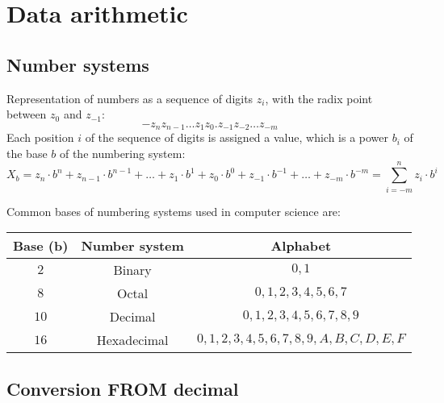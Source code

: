 \newpage
\section{Data arithmetic}
\subsection{Number systems}
\begin{definition}[Positional]
	Representation of numbers as a sequence of digits $z_i$, with the radix point between $z_0$ and $z_{-1}$:
	\begin{equation}
		-z_n z_{n-1} \ldots z_1 z_0 . z_{-1} z_{-2} \ldots z_{-m}
	\end{equation}
	Each position $i$ of the sequence of digits is assigned a value, which is a power $b_i$ of the base $b$ of the numbering system:
	\begin{equation}
		X_b = z_n\cdot b ^n + z_{n-1} \cdot b^{n-1} + \ldots + z_1 \cdot b^1 + z_0 \cdot b^0 + z_{-1} \cdot b^{-1} + \ldots + z_{-m} \cdot b^{-m} = \sum_{i=-m}^{n} z_i \cdot b^i\label{eq:1}
	\end{equation}
\end{definition}

Common bases of numbering systems used in computer science are:
\begin{table}[!h]
	\centering
	\begin{tabular}{|c|c|c|}
		\hline
		 \textbf{Base (b)} & \textbf{Number system} & \textbf{Alphabet} \\
		 \hline
		 $2$ & Binary & $0, 1$ \\
		\hline
		$8$ & Octal & $0,1,2,3,4,5,6,7$ \\
		\hline
		$10$ & Decimal & $0,1,2,3,4,5,6,7,8,9$ \\
		\hline
		$16$ & Hexadecimal & $0,1,2,3,4,5,6,7,8,9,A,B,C,D,E,F$ \\
		\hline
	\end{tabular}
\end{table}

\subsection{Conversion FROM decimal}
